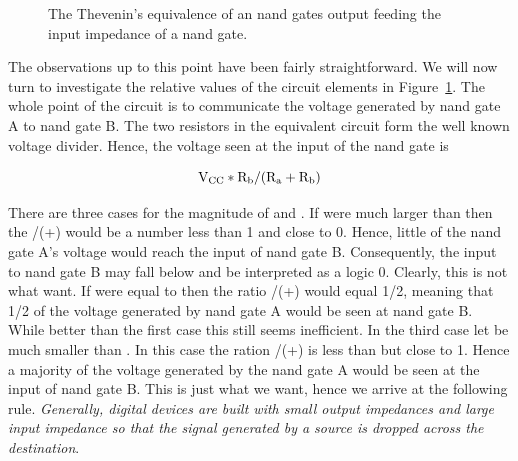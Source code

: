 \begin{figure}[ht]
\caption{The Thevenin's equivalence of an nand gates output feeding the
input impedance of a nand gate.}
\label{fig:impedance}
\end{figure}

The observations up to this point have been fairly straightforward.
We will now turn to investigate the relative values of the circuit
elements in Figure~\ref{fig:impedance}.  The whole point of the
circuit is to communicate the voltage generated by nand gate A to
nand gate B.  The two resistors in the equivalent circuit form the
well known voltage divider.  Hence, the voltage seen at the input
of the nand gate is 

	$$ {\rm V}_{\rm CC}  *
		{\rm R}_{\rm b}  / 
		( {\rm R}_{\rm a} + {\rm R}_{\rm b} ) $$


There are three
cases for the magnitude of \Ra and \Rb.  If \Ra were much larger
than \Rb then the \Rb/(\Ra+\Rb) would be a number less than 1 
and close to 0.  Hence, little of the nand gate A's voltage 
would reach the input of nand gate B.  Consequently, the input
to nand gate B may fall below \VIL and be interpreted as a logic
0.  Clearly, this is not
what want.  If \Ra were equal to \Rb then the ratio \Rb/(\Ra+\Rb) 
would equal 1/2, meaning that 1/2 of the voltage generated by nand
gate A would be seen at nand gate B.  While better than the first
case this still seems inefficient.  In the third case let
\Ra be much smaller than \Rb.  In this case the ration \Rb/(\Ra+\Rb)
is less than but close to 1.  Hence a majority of the voltage
generated by the nand gate A would be seen at the input of nand gate
B. This is just what we want, hence we arrive at the following
rule. {\it Generally, digital devices are built with small output
impedances and large input impedance so that the signal
generated by a source is dropped across the destination}.

